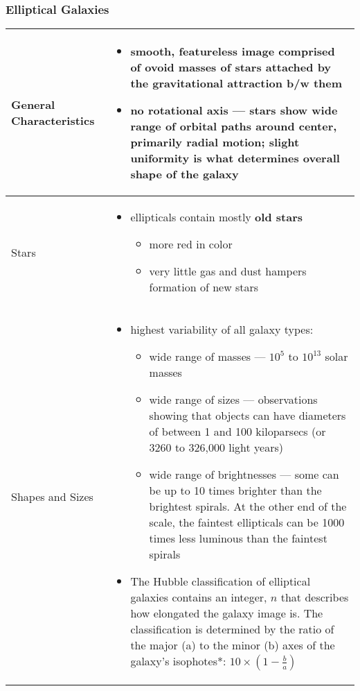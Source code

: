\subsubsection{Elliptical Galaxies}
\begin{longtabu} to 
\hline
	General Characteristics &
	\begin{itemize}[noitemsep]
		\item smooth, featureless image comprised of ovoid masses of stars attached by the gravitational attraction b/w them
		\item no rotational axis --- stars show wide range of orbital paths around center, primarily radial motion; slight uniformity is what determines overall shape of the galaxy
	\end{itemize}
	\\
	\hline
	Stars &
	\begin{itemize}[noitemsep]
		\item ellipticals contain mostly \textbf{old stars}
			\begin{itemize}[noitemsep]
				\item more red in color
				\item very little gas and dust hampers formation of new stars
			\end{itemize}
	\end{itemize}
	\\
	\hline
	Shapes and Sizes &
	\begin{itemize}[noitemsep]
		\item highest variability of all galaxy types:
			\begin{itemize}[noitemsep]
				\item wide range of masses --- $10^{5}$ to $10^{13}$ solar masses
				\item wide range of sizes --- observations showing that objects can have diameters of between 1 and 100 kiloparsecs (or 3260 to 326,000 light years)
				\item wide range of brightnesses --- some can be up to 10 times brighter than the brightest spirals. At the other end of the scale, the faintest ellipticals can be 1000 times less luminous than the faintest spirals
			\end{itemize}
		\item The Hubble classification of elliptical galaxies contains an integer, $n$ that describes how elongated the galaxy image is. The classification is determined by the ratio of the major (a) to the minor (b) axes of the galaxy's \gls{isophote}s*: $ 10 \times (1 - \frac{b}{a}) $

\end{itemize}
\end{longtabu}
